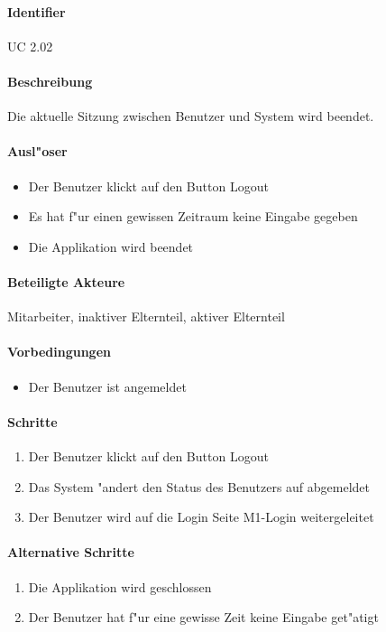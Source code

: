   \paragraph{Identifier}
  UC 2.02
  \paragraph{Beschreibung}
  Die aktuelle Sitzung zwischen Benutzer und System wird beendet.
  \paragraph{Ausl"oser}
  \begin{itemize}
   \item Der Benutzer klickt auf den Button \dq Logout\dq
   \item Es hat f"ur einen gewissen Zeitraum keine Eingabe gegeben
   \item Die Applikation wird beendet
  \end{itemize}

  \paragraph{Beteiligte Akteure}   \leavevmode \newline
    Mitarbeiter, inaktiver Elternteil, aktiver Elternteil
  \paragraph{Vorbedingungen}
  \begin{itemize}
   \item Der Benutzer ist angemeldet
  \end{itemize}

  \paragraph{Schritte}
  \begin{enumerate}
   \item Der Benutzer klickt auf den Button \dq Logout\dq
   \item Das System "andert den Status des Benutzers auf \dq abgemeldet\dq
   \item Der Benutzer wird auf die Login Seite M1-Login weitergeleitet
  \end{enumerate}

  \paragraph{Alternative Schritte}
  \begin{enumerate}
  \setcounter{enumi}{0}
   \item Die Applikation wird geschlossen
   \setcounter{enumi}{0}
   \item Der Benutzer hat f"ur eine gewisse Zeit keine Eingabe get"atigt
  \end{enumerate}

